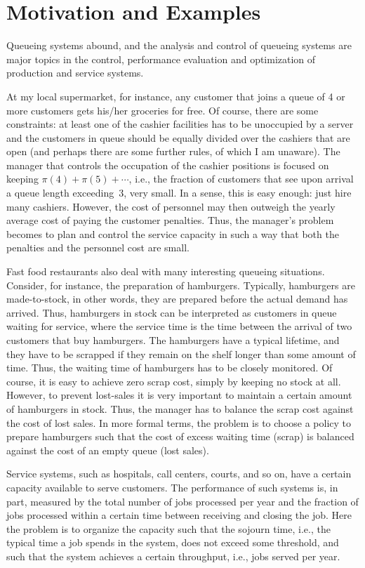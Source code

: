 \section*{Motivation and Examples}
Queueing systems abound, and the analysis and control of queueing systems are major topics in the control, performance evaluation and optimization of production and service systems.


At my local supermarket, for instance, any customer that joins a queue of 4 or more customers gets his/her groceries for free.
Of course, there are some constraints: at least one of the cashier facilities has to be unoccupied by a server and the customers in queue should be equally divided over the cashiers that are open (and perhaps there are some further rules, of which I am unaware).
The manager that controls the occupation of the cashier positions is focused on keeping $\pi(4)+\pi(5)+\cdots$, i.e., the fraction of customers that see upon arrival a queue length exceeding~3, very small.
In a sense, this is easy enough: just hire many cashiers.
However, the cost of personnel may then outweigh the yearly average cost of paying the customer penalties.
Thus, the manager's problem becomes to plan and control the service capacity in such a way that both the penalties and the personnel cost are small.

Fast food restaurants also deal with many interesting queueing situations.
Consider, for instance, the preparation of hamburgers.
Typically, hamburgers are made-to-stock, in other words, they are prepared before the actual demand has arrived.
Thus, hamburgers in stock can be interpreted as customers in queue waiting for service, where the service time is the time between the arrival of two customers that buy hamburgers.
The hamburgers have a typical lifetime, and they have to be scrapped if they remain on the shelf longer than some amount of time.
Thus, the waiting time of hamburgers has to be closely monitored.
Of course, it is easy to achieve zero scrap cost, simply by keeping no stock at all.
However, to prevent lost-sales it is very important to maintain a certain amount of hamburgers in stock.
Thus, the manager has to balance the scrap cost against the cost of lost sales.
In more formal terms, the problem is to choose a policy to prepare hamburgers such that the cost of excess waiting time (scrap) is balanced against the cost of an empty queue (lost sales).

Service systems, such as hospitals, call centers, courts, and so on,
have a certain capacity available to serve customers. The performance
of such systems is, in part, measured by the total number of jobs
processed per year and the fraction of jobs processed within a certain
time between receiving and closing the job. Here the problem is to
organize the capacity such that the sojourn time, i.e., the typical
time a job spends in the system, does not exceed some threshold, and
such that the system achieves a certain throughput, i.e., jobs served
per year. 

